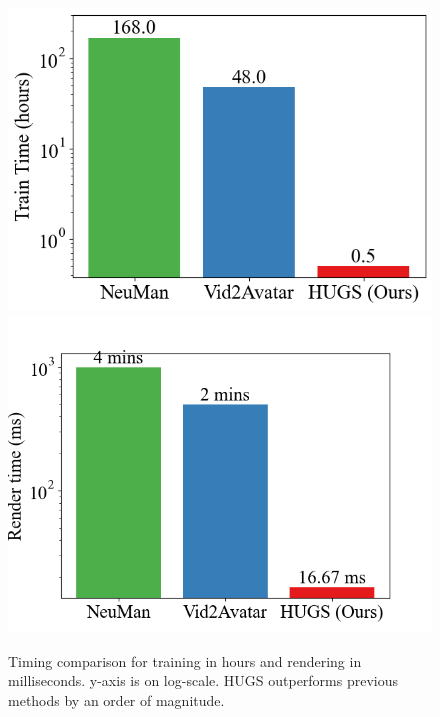 \begin{figure}[t]
    \centering
    \includegraphics[width=0.49\linewidth]{figures/pngs/train_time.png}
    \includegraphics[width=0.49\linewidth]{figures/pngs/render_time.png}
    \caption{{Timing comparison for training in hours and rendering in milliseconds. y-axis is  on log-scale. HUGS outperforms previous methods by an order of magnitude. }} 
    \label{fig:timing}
\end{figure}